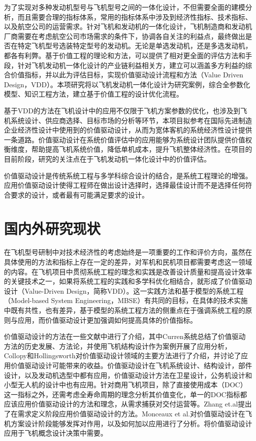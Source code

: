 \documentclass[12pt,a4paper]{report}
\begin{document}
为了实现对多种发动机型号与飞机型号之间的一体化设计，不但需要全面的建模分析，而且需要合理的指标体系，常用的指标体系中涉及到经济性指标、技术指标、以及航空公司的运营需求。针对飞机和发动机的一体化设计，飞机制造商和发动机厂商需要在考虑航空公司市场需求的条件下，协调各自关注的利益点，最终做出是否在特定飞机型号选装特定型号的发动机。无论是单选发动机，还是多选发动机，都各有利弊。基于价值工程的理论和方法，可以提供了相对更全面的评估方法和手段，针对飞机发动机一体化设计的产业链利益相关方，建立可以涵盖多方利益的综合价值指标，并以此为评估目标，实现价值驱动设计流程和方法（Value Driven Design，VDD）。本项研究将以飞机发动机一体化设计为研究案例，综合全参数化模型、知识工程方法，建立基于价值工程的设计优化流程。

基于VDD的方法在飞机设计中的应用不仅限于飞机方案参数的优化，也涉及到飞机系统设计、供应商选择、目标市场的分析等环节，本项目拟参考在国际先进制造企业经济性设计中使用到的价值驱动设计，从而为宽体客机的系统经济性设计提供一条道路。价值驱动设计在系统价值评估中的应用能够为系统设计团队提供价值权衡维度，帮助提高飞机系统价值，降低单机成本，提升飞机整体经济性。在项目的目前阶段，研究的关注点在于飞机发动机一体化设计中的价值评估。

价值驱动设计是传统系统工程与多学科综合设计的结合，是系统工程理论的增强。应用价值驱动设计使得工程师在做出设计选择时，选择最佳设计而不是选择任何符合要求的设计，或者最有可能满足要求的设计。


\section{国内外研究现状}

在飞机型号研制中对技术经济性的考虑始终是一项重要的工作和评价方向，虽然在具体使用的方法和指标上存在一定的差异，对军机和民机项目都需要考虑这一领域的内容。在飞机项目中贯彻系统工程的理念和实践是改善设计质量和提高设计效率的关键技术之一，如果将系统工程的实践和多学科优化相结合，就形成了价值驱动设计（Value-Driven Design，简称VDD）。这一实践方法和基于模型的系统工程（Model-based System Engineering，MBSE）有共同的目标，在具体的技术实施中既有共性，也有差异，基于模型的系统工程方法的侧重点在于强调系统工程的原则与应用，而价值驱动设计更加强调如何提高具体的价值指标。

价值驱动设计的方法在一些文献中进行了介绍，其中Curren\cite{777curran2010value}系统总结了价值驱动方法的历史发展、方法论，并使用飞机结构设计作为案例开展了应用分析，Collopy和Hollingsworth\cite{53collopy2011value}对价值驱动设计领域的主要方法进行了介绍，并讨论了应用价值驱动设计可能带来的收益。价值驱动设计在飞机系统设计\cite{1313mullan2012development}、结构设计\cite{515castagne2006value}，部件设计\cite{1210cheung2009aerospace}，以及发动机选型中\cite{377cheung2012application}都有应用，价值驱动设计方法在卫星设计\cite{1318richardson2014incorporating}，公务机设计\cite{1312downen2006methodology}和小型无人机的设计中也有应用\cite{516ferraro2012toward}。针对商用飞机项目，除了直接使用成本（DOC）这一指标之外，还需考虑全寿命周期的理念分析其价值变化，单一的DOC指标都应该应用价值驱动设计的方法和理念，从需求捕获对交付运营等。Zhang et.al提出了在需求定义阶段应用价值驱动设计的方法\cite{1267zhang2013prescriptive}。Monceaux et al.对价值驱动设计在飞机方案设计阶段能够发挥对作用，以及如何加以应用进行了分析\cite{1297monceaux2014overview}。将价值驱动设计应用于飞机概念设计决策中需要。
\end{document}

